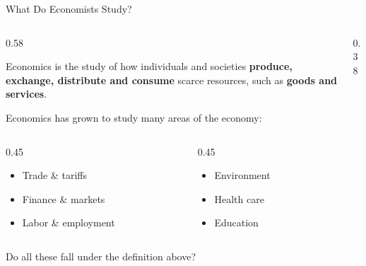 \documentclass[9pt,english,aspectratio=169]{beamer}
\begin{document}
\begin{frame}{What Do Economists Study?}

	\begin{columns}[T]
    \begin{column}{0.58\textwidth}
       \begin{definitionbox}[Economics]
    Economics is the study of how individuals and societies \textbf{produce, exchange, distribute and consume} scarce resources, such as \textbf{goods and services}.
  \end{definitionbox}

	Economics has grown to study many areas of the economy:

  \vspace{0.3em}
  \begin{columns}[T]
     \begin{column}{0.45\textwidth}
      \begin{itemize}
        \item Trade \& tariffs
        \item Finance \& markets
        \item Labor \& employment
      \end{itemize}
    \end{column}
    \begin{column}{0.45\textwidth}
      \begin{itemize}
        \item Environment
        \item Health care
        \item Education
      \end{itemize}
    \end{column}
  \end{columns} \pause
    \end{column}

    \begin{column}{0.38\textwidth}
    \end{column}
  \end{columns}


  \vspace{2em}
  Do all these fall under the definition above?

\end{frame}
\end{document}
